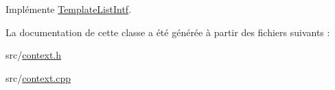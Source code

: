Implémente \hyperlink{class_template_list_intf_a0c53169c740c09dac47efc62bbe39674}{Template\+List\+Intf}.



La documentation de cette classe a été générée à partir des fichiers suivants \+:\begin{DoxyCompactItemize}
\item 
src/\hyperlink{context_8h}{context.\+h}\item 
src/\hyperlink{context_8cpp}{context.\+cpp}\end{DoxyCompactItemize}
